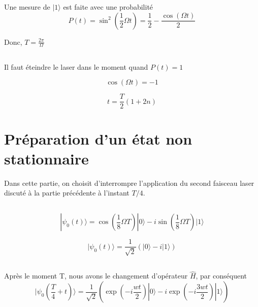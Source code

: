 \documentclass[a4paper,12pt]{article}
\begin{document}
Une mesure de $|1\rangle$ est faite avec une probabilité 
\begin{equation}\label{key}
	P(t) = \sin^2\left(\frac 12\Omega t\right) = \frac 12 -\frac{\cos (\Omega t)}{2}
\end{equation}

Donc, $T = \displaystyle\frac{2\pi}{\Omega}$

\subsection{}

Il faut éteindre le laser dans le moment quand $P(t) = 1$ 

\begin{equation}\label{key}
	\cos (\Omega t) = -1
\end{equation}

\begin{equation}\label{key}
	t = \frac{T}2(1+2n)
\end{equation}


\section{Préparation d’un état non stationnaire}

Dans cette partie, on choisit d’interrompre l’application du second faisceau laser discuté à la partie précédente à l’instant $T/4$.

\subsection{}

\begin{equation}\label{key}
	|\psi_0(t)\rangle = \cos\left(\frac 18\Omega T\right)|0\rangle -i \sin\left(\frac 18\Omega T\right)|1\rangle
\end{equation}

\begin{equation}\label{key}
	|\psi_0(t)\rangle = \frac{1}{\sqrt 2}(|0\rangle - i|1\rangle)
\end{equation}

\subsection{}

Après le moment T, nous avons le changement d'opérateur $\hat H$, par conséquent 
\begin{equation}\label{key}
	|\psi_0(\frac T 4 + t)\rangle = \frac{1}{\sqrt 2}(\exp(-i\frac{wt}{2})|0\rangle - i\exp(-i\frac{3wt}{2})|1\rangle)
\end{equation}
\end{document}
